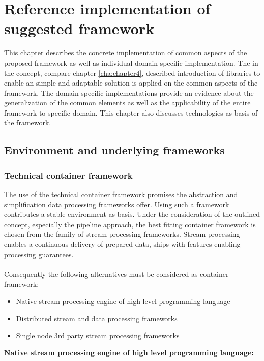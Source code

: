 \chapter{Reference implementation of suggested framework\label{cha:chapter5}}

This chapter describes the concrete implementation of common aspects of the proposed framework as well as individual domain specific implementation. The in the concept, compare chapter \ref{cha:chapter4}, described introduction of libraries to enable an simple and adaptable solution is applied on the common aspects of the framework. The domain specific implementations provide an evidence about the generalization of the common elements as well as the applicability of the entire framework to specific domain. This chapter also discusses technologies as basis of the framework. 

\section{Environment and underlying frameworks\label{sec:env}}

\subsection{Technical container framework}

The use of the technical container framework promises the abstraction and simplification data processing frameworks offer. Using such a framework contributes a stable environment as basis. Under the consideration of the outlined concept, especially the pipeline approach, the best fitting container framework is chosen from the family of stream processing frameworks. Stream processing enables a continuous delivery of prepared data, ships with features enabling processing guarantees.
\\\\
Consequently the following alternatives must be considered as container framework:
\begin{itemize}
\item Native stream processing engine of high level programming language
\item Distributed stream and data processing frameworks
\item Single node 3rd party stream processing frameworks\\
\end{itemize}

\noindent\textbf{Native stream processing engine of high level programming language:}

